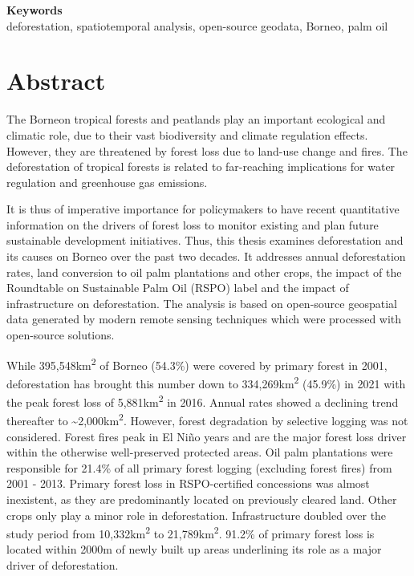 \documentclass[
  letterpaper,
  DIV=11,
  numbers=noendperiod]{scrreprt}
\begin{document}
\noindent\textbf{Keywords}\\
deforestation, spatiotemporal analysis, open-source geodata, Borneo, palm oil

\ifdefined\Shaded\renewenvironment{Shaded}{\begin{tcolorbox}[sharp corners, borderline west={3pt}{0pt}{shadecolor}, frame hidden, enhanced, boxrule=0pt, interior hidden, breakable]}{\end{tcolorbox}}\fi


\hypertarget{abstract}{%
\chapter*{Abstract}\label{abstract}}


The Borneon tropical forests and peatlands play an important ecological
and climatic role, due to their vast biodiversity and climate regulation
effects. However, they are threatened by forest loss due to land-use
change and fires. The deforestation of tropical forests is related to
far-reaching implications for water regulation and greenhouse gas
emissions.

It is thus of imperative importance for policymakers to have recent
quantitative information on the drivers of forest loss to monitor
existing and plan future sustainable development initiatives. Thus, this
thesis examines deforestation and its causes on Borneo over the past two
decades. It addresses annual deforestation rates, land conversion to oil
palm plantations and other crops, the impact of the Roundtable on
Sustainable Palm Oil (RSPO) label and the impact of infrastructure on
deforestation. The analysis is based on open-source geospatial data
generated by modern remote sensing techniques which were processed with
open-source solutions.

While 395,548km\textsuperscript{2} of Borneo (54.3\%) were covered by
primary forest in 2001, deforestation has brought this number down to
334,269km\textsuperscript{2} (45.9\%) in 2021 with the peak forest loss
of 5,881km\textsuperscript{2} in 2016. Annual rates showed a declining
trend thereafter to \textasciitilde2,000km\textsuperscript{2}. However,
forest degradation by selective logging was not considered. Forest fires
peak in El Niño years and are the major forest loss driver within the
otherwise well-preserved protected areas. Oil palm plantations were
responsible for 21.4\% of all primary forest logging (excluding forest
fires) from 2001 - 2013. Primary forest loss in RSPO-certified
concessions was almost inexistent, as they are predominantly located on
previously cleared land. Other crops only play a minor role in
deforestation. Infrastructure doubled over the study period from
10,332km\textsuperscript{2} to 21,789km\textsuperscript{2}. 91.2\% of
primary forest loss is located within 2000m of newly built up areas
underlining its role as a major driver of deforestation.
\end{document}
